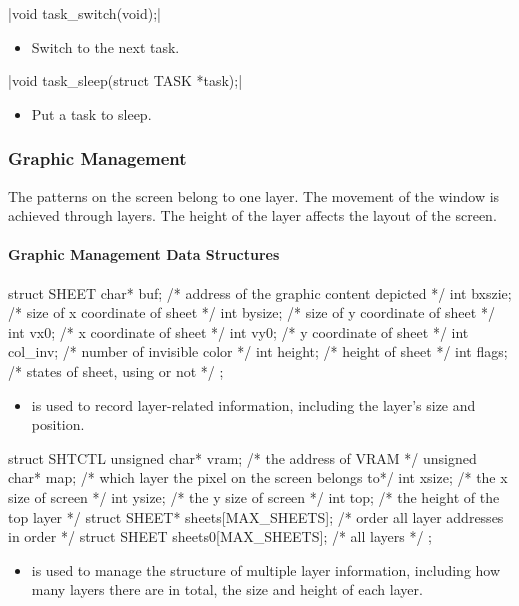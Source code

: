 \documentclass{swfcthesis}
\begin{document}
\csingle|void task_switch(void);|
\begin{itemize}
\item Switch to the next task.
\end{itemize}

\csingle|void task_sleep(struct TASK *task);|
\begin{itemize}
\item Put a task to sleep.
\end{itemize}

\subsubsection{Graphic Management}
\label{sec:graphic}

The patterns on the screen belong to one layer. The movement of the window is achieved
through layers. The height of the layer affects the layout of the
screen. 
  
\paragraph{Graphic Management Data Structures}

\begin{codeblock}[1]
\begin{ccode}
struct SHEET
{ 
  char* buf;   /* address of the graphic content depicted */
  int bxszie;  /* size of x coordinate of sheet */
  int bysize;  /* size of y coordinate of sheet */
  int vx0;     /* x coordinate of sheet */
  int vy0;     /* y coordinate of sheet */
  int col_inv; /* number of invisible color */
  int height;  /* height of sheet */
  int flags;   /* states of sheet, using or not */
};
\end{ccode}
\end{codeblock}
\begin{itemize}
\item is used to record layer-related information, including the layer's size and
  position.
\end{itemize}

\begin{codeblock}[1]
\begin{ccode}
struct SHTCTL
{ 
  unsigned char* vram; /* the address of VRAM */
  unsigned char* map;  /* which layer the pixel on the screen belongs to*/
  int xsize; /* the x size of screen */
  int ysize; /* the y size of screen */
  int top;   /* the height of the top layer */
  struct SHEET* sheets[MAX_SHEETS]; /* order all layer addresses in order */
  struct SHEET sheets0[MAX_SHEETS]; /* all layers */
};
\end{ccode}
\end{codeblock}
\begin{itemize}
\item is used to manage the structure of multiple layer information, including how many
  layers there are in total, the size and height of each layer.
\end{itemize}
\end{document}
